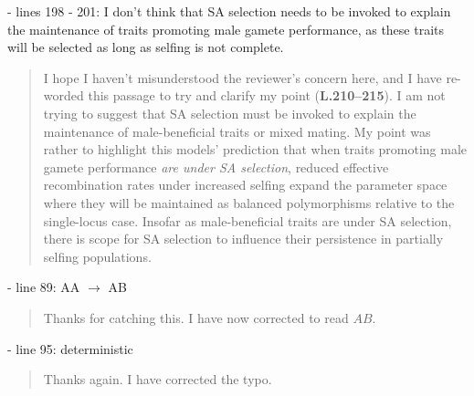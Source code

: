 \documentclass[11pt]{article}
\begin{document}
 - lines 198 - 201: I don't think that SA selection needs to be invoked to explain the maintenance of traits promoting male gamete performance, as these traits will be selected as long as selfing is not complete.

	\begin{quote}
		I hope I haven't misunderstood the reviewer's concern here, and I have re-worded this passage to try and clarify my point (\textbf{L.210--215}). I am not trying to suggest that SA selection must be invoked to explain the maintenance of male-beneficial traits or mixed mating. My point was rather to highlight this models' prediction that when traits promoting male gamete performance \textit{are under SA selection}, reduced effective recombination rates under increased selfing expand the parameter space where they will be maintained as balanced polymorphisms relative to the single-locus case. Insofar as male-beneficial traits are under SA selection, there is scope for SA selection to influence their persistence in partially selfing populations.
	\end{quote}

 - line 89: AA $\rightarrow$ AB

	\begin{quote}
		Thanks for catching this. I have now corrected to read $AB$.
	\end{quote}

 - line 95: deterministic

	\begin{quote}
		Thanks again. I have corrected the typo.
	\end{quote}
\end{document}
